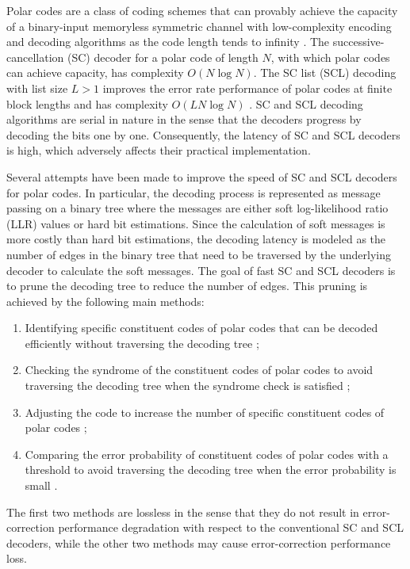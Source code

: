 \documentclass[conference]{IEEEtran}
\begin{document}
Polar codes are a class of coding schemes that can provably achieve the capacity of a binary-input memoryless symmetric channel with low-complexity encoding and decoding algorithms as the code length tends to infinity \cite{arikan2009}.
The successive-cancellation (SC) decoder for a polar code of length $N$, with which polar codes can achieve capacity, has complexity $O(N\log N)$. The SC list (SCL) decoding with list size $L>1$ improves the error rate performance of polar codes at finite block lengths and has complexity $O(LN\log N)$ \cite{tal2015list}. SC and SCL decoding algorithms are serial in nature in the sense that the decoders progress by decoding the bits one by one. Consequently, the latency of SC and SCL decoders is high, which adversely affects their practical implementation.

Several attempts have been made to improve the speed of SC and SCL decoders for polar codes. In particular, the decoding process is represented as message passing on a binary tree where the messages are either soft log-likelihood ratio (LLR) values or hard bit estimations. Since the calculation of soft messages is more costly than hard bit estimations, the decoding latency is modeled as the number of edges in the binary tree that need to be traversed by the underlying decoder to calculate the soft messages. The goal of fast SC and SCL decoders is to prune the decoding tree to reduce the number of edges. This pruning is achieved by the following main methods:
\begin{enumerate}
    \item Identifying specific constituent codes of polar codes that can be decoded efficiently without traversing the decoding tree \cite{BYuan2Bit,sarkis2013increasing,husmann2017reduced,alamdar2011simplified,sarkis2014fast,giard2016multi,hanif2017fast,condo2018generalized,gamage2019low,ercan2017reduced,ercan2019operation,sarkis2016fast,hashemi2016fast,hashemi2017fast,hanif2018fast,mondelli2021sublinear,hashemi2021parallelism};
    \item Checking the syndrome of the constituent codes of polar codes to avoid traversing the decoding tree when the syndrome check is satisfied \cite{yoo2016comml,choi2017comml,kim2018ET};
    \item Adjusting the code to increase the number of specific constituent codes of polar codes \cite{huang2012latency,balatsoukas2014enabling,zhang2015simplified,638mbps,giard2018fast};
    \item Comparing the error probability of constituent codes of polar codes with a threshold to avoid traversing the decoding tree when the error probability is small \cite{li2018low,zheng2020icc}.
\end{enumerate}
The first two methods are lossless in the sense that they do not result in error-correction performance degradation with respect to the conventional SC and SCL decoders, while the other two methods may cause error-correction performance loss.
\end{document}
